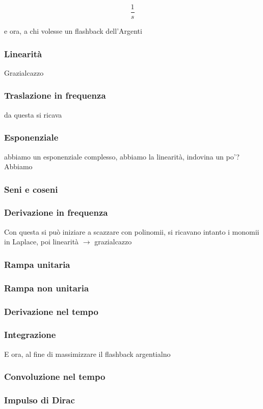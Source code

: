 \documentclass[11pt]{article}
\begin{document}
\[ \frac{1}{s} \]


e ora, a chi volesse un flashback dell'Argenti

\subsubsection{Linearità}
\label{sec:org073ea8b}

Grazialcazzo

\subsubsection{Traslazione in frequenza}
\label{sec:orgafa5ec2}

da questa si ricava

\subsubsection{Esponenziale}
\label{sec:orgd3c8f46}

abbiamo un esponenziale complesso, abbiamo la linearità, indovina un
po'? Abbiamo

\subsubsection{Seni e coseni}
\label{sec:org798e986}

\subsubsection{Derivazione in frequenza}
\label{sec:org8abef60}

Con questa si può iniziare a scazzare con polinomii, si ricavano
intanto i monomii in Laplace, poi linearità \(\to\) grazialcazzo

\subsubsection{Rampa unitaria}
\label{sec:org4edafa1}

\subsubsection{Rampa non unitaria}
\label{sec:orge56faf9}

\subsubsection{Derivazione nel tempo}
\label{sec:org64bce70}

\subsubsection{Integrazione}
\label{sec:orgdbced96}

E ora, al fine di massimizzare il flashback argentialno

\subsubsection{Convoluzione nel tempo}
\label{sec:org43d56d2}

\subsubsection{Impulso di Dirac}
\label{sec:org5150283}
\end{document}
